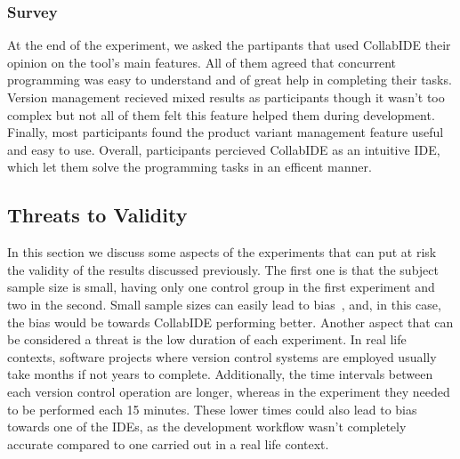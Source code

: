 \subsubsection{Survey}
At the end of the experiment, we asked the partipants that used CollabIDE their opinion on the tool's main features. All of them agreed that concurrent programming was easy to understand and  of great help in completing their tasks. Version management recieved mixed results as participants though it wasn't too complex but not all of them felt this feature helped them during development. Finally, most participants found the product variant management feature useful and easy to use. Overall, participants percieved CollabIDE as an intuitive IDE, which let them solve the programming tasks in an efficent manner. 

\subsection{Threats to Validity}
In this section we discuss some aspects of the experiments that can put at risk the validity of the results discussed previously. The first one is that the subject sample size is small, having only one control group in the first experiment and two in the second. Small sample sizes can easily lead to bias~\cite{threatstoval}, and, in this case, the bias would be towards CollabIDE performing better. Another aspect that can be considered a threat is the low duration of each experiment. In real life contexts, software projects where version control systems are employed usually take months if not years to complete. Additionally, the time intervals between each version control operation are longer, whereas in the experiment they needed to be performed each 15 minutes. These lower times could also lead to bias towards one of the IDEs, as the development workflow wasn't completely accurate compared to one carried out in a real life context. 


\endinput
